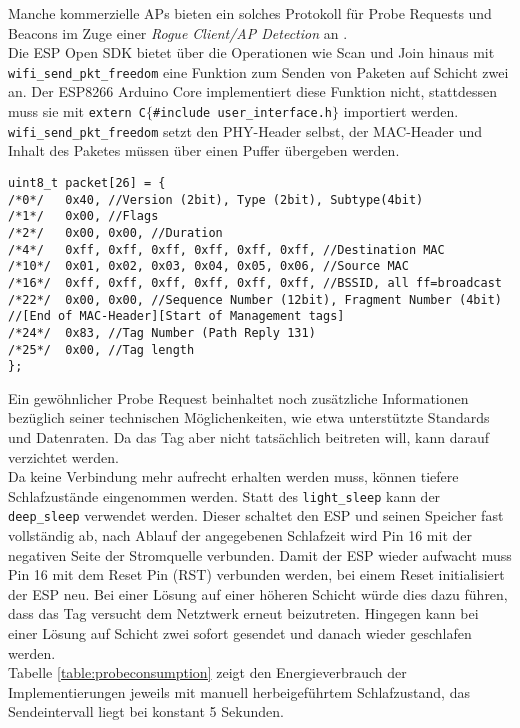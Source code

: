 Manche kommerzielle APs bieten ein solches Protokoll für Probe Requests und Beacons im Zuge einer \textit{Rogue Client/AP Detection} an \cite{lancom2017rouge}.\\
Die ESP Open SDK bietet über die Operationen wie Scan und Join hinaus mit \texttt{wifi\_send\_pkt\_freedom} eine Funktion zum Senden von Paketen auf Schicht zwei an.
Der ESP8266 Arduino Core implementiert diese Funktion nicht, stattdessen muss sie mit \texttt{extern \dq C\dq $\lbrace$\#include \dq user\_interface.h\dq $\rbrace$} importiert werden. \\
\texttt{wifi\_send\_pkt\_freedom} setzt den PHY-Header selbst, der MAC-Header und Inhalt des Paketes müssen über einen Puffer übergeben werden.
\begin{verbatim}
uint8_t packet[26] = { 
/*0*/ 	0x40, //Version (2bit), Type (2bit), Subtype(4bit)
/*1*/ 	0x00, //Flags 
/*2*/ 	0x00, 0x00, //Duration
/*4*/   0xff, 0xff, 0xff, 0xff, 0xff, 0xff, //Destination MAC
/*10*/  0x01, 0x02, 0x03, 0x04, 0x05, 0x06, //Source MAC
/*16*/  0xff, 0xff, 0xff, 0xff, 0xff, 0xff, //BSSID, all ff=broadcast
/*22*/  0x00, 0x00, //Sequence Number (12bit), Fragment Number (4bit) 
//[End of MAC-Header][Start of Management tags]
/*24*/  0x83, //Tag Number (Path Reply 131) 
/*25*/ 	0x00, //Tag length
}; 
\end{verbatim}
Ein gewöhnlicher Probe Request beinhaltet noch zusätzliche Informationen bezüglich seiner technischen Möglichenkeiten, wie etwa unterstützte Standards und Datenraten. 
Da das Tag aber nicht tatsächlich beitreten will, kann darauf verzichtet werden. \\
Da keine Verbindung mehr aufrecht erhalten werden muss, können tiefere Schlafzustände eingenommen werden. 
Statt des \texttt{light\_sleep} kann der \texttt{deep\_sleep} verwendet werden.
Dieser schaltet den ESP und seinen Speicher fast vollständig ab, nach Ablauf der angegebenen Schlafzeit wird Pin 16 mit der negativen Seite der Stromquelle verbunden.
Damit der ESP wieder aufwacht muss Pin 16 mit dem Reset Pin (RST) verbunden werden, bei einem Reset initialisiert der ESP neu.
Bei einer Lösung auf einer höheren Schicht würde dies dazu führen, dass das Tag versucht dem Netztwerk erneut beizutreten. 
Hingegen kann bei einer Lösung auf Schicht zwei sofort gesendet und danach wieder geschlafen werden.\\
Tabelle \ref{table:probeconsumption} zeigt den Energieverbrauch der Implementierungen jeweils mit manuell herbeigeführtem Schlafzustand, das Sendeintervall liegt bei konstant 5 Sekunden.
